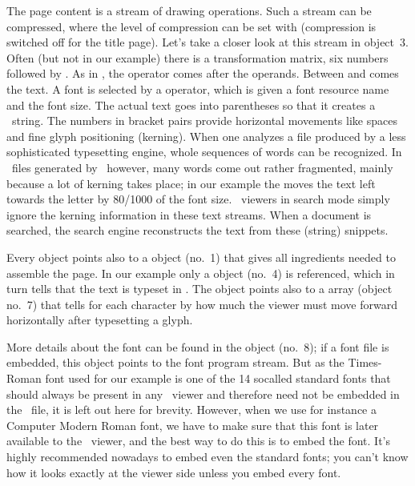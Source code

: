 \documentclass{pdftexmanual}
\begin{document}
The page content is a stream of drawing operations. Such a stream can be
compressed, where the level of compression can be set with
 (compression is switched off for the title page).
Let's take a closer look at this stream in object~3. Often (but not in
our example) there is a transformation matrix, six numbers followed by
. As in \POSTSCRIPT, the operator comes after the operands.
Between  and  comes the text. A font is selected by a
 operator, which is given a font resource name  and
the font size. The actual text goes into parentheses \type{()} so that
it creates a \POSTSCRIPT\ string. The numbers in bracket pairs provide
horizontal movements like spaces and fine glyph positioning (kerning).
When one analyzes a file produced by a less sophisticated typesetting
engine, whole sequences of words can be recognized. In \PDF\ files
generated by \PDFTEX\ however, many words come out rather fragmented,
mainly because a lot of kerning takes place; in our example the
 moves the text  left towards the letter
 by 80/1000 of the font size. \PDF\ viewers in search mode
simply ignore the kerning information in these text streams. When a
document is searched, the search engine reconstructs the text from these
(string) snippets.

Every  object points also to a  object
(no.~1) that gives all ingredients needed to assemble the page. In our
example only a  object (no.~4) is referenced, which in turn
tells that the text is typeset in  . The
 object points also to a  array (object no.~7)
that tells for each character by how much the viewer must move forward
horizontally after typesetting a glyph.

More details about the font can be found in the 
object (no.~8); if a font file is embedded, this object points to the
font program stream. But as the Times-Roman font used for our example is
one of the 14 so\hyph called standard fonts that should always be present in
any \PDF\ viewer and therefore need not be embedded in the \PDF\ file,
it is left out here for brevity. However, when we use for instance a
Computer Modern Roman font, we have to make sure that this font is later
available to the \PDF\ viewer, and the best way to do this is to embed
the font. It's highly recommended nowadays to embed even the standard
fonts; you can't know how it looks exactly at the viewer side unless you
embed every font.
\end{document}
